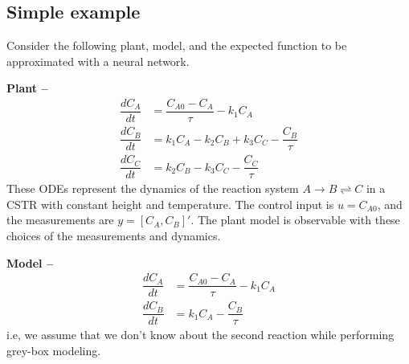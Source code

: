 \documentclass{article}
\begin{document}
\subsection{Simple example}

Consider the following plant, model,
and the expected function to be approximated 
with a neural network.

\textbf{Plant --}
\begin{align*}
  \dfrac{dC_A}{dt} &= \dfrac{C_{A0} - C_A}{\tau} - k_1C_A\\
  \dfrac{dC_B}{dt} &= k_1C_A - k_2C_B + k_3C_C- \dfrac{C_B}{\tau}\\
  \dfrac{dC_C}{dt} &= k_2C_B - k_3C_C - \dfrac{C_C}{\tau}
\end{align*}
These ODEs represent the dynamics of the reaction system
$A \rightarrow B \rightleftharpoons C$ in a CSTR with constant 
height and temperature. The control input is $u = C_{A0}$, 
and the measurements are $y = [C_A, C_B]'$. The plant model 
is observable with these choices of the measurements and dynamics.

\textbf{Model --}
\begin{align*}
  \dfrac{dC_A}{dt} &= \dfrac{C_{A0} - C_A}{\tau} - k_1C_A\\
  \dfrac{dC_B}{dt} &= k_1C_A - \dfrac{C_B}{\tau}
\end{align*}
i.e, we assume that we don't know about the second reaction while 
performing grey-box modeling.

\end{document}
